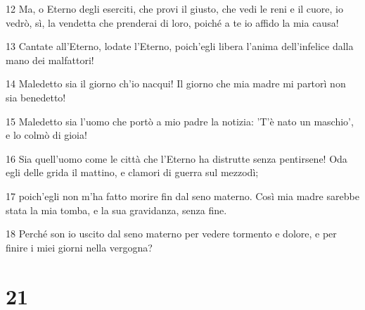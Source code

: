 \par 12 Ma, o Eterno degli eserciti, che provi il giusto, che vedi le reni e il cuore, io vedrò, sì, la vendetta che prenderai di loro, poiché a te io affido la mia causa!
\par 13 Cantate all'Eterno, lodate l'Eterno, poich'egli libera l'anima dell'infelice dalla mano dei malfattori!
\par 14 Maledetto sia il giorno ch'io nacqui! Il giorno che mia madre mi partorì non sia benedetto!
\par 15 Maledetto sia l'uomo che portò a mio padre la notizia: 'T'è nato un maschio', e lo colmò di gioia!
\par 16 Sia quell'uomo come le città che l'Eterno ha distrutte senza pentirsene! Oda egli delle grida il mattino, e clamori di guerra sul mezzodì;
\par 17 poich'egli non m'ha fatto morire fin dal seno materno. Così mia madre sarebbe stata la mia tomba, e la sua gravidanza, senza fine.
\par 18 Perché son io uscito dal seno materno per vedere tormento e dolore, e per finire i miei giorni nella vergogna?

\chapter{21}

